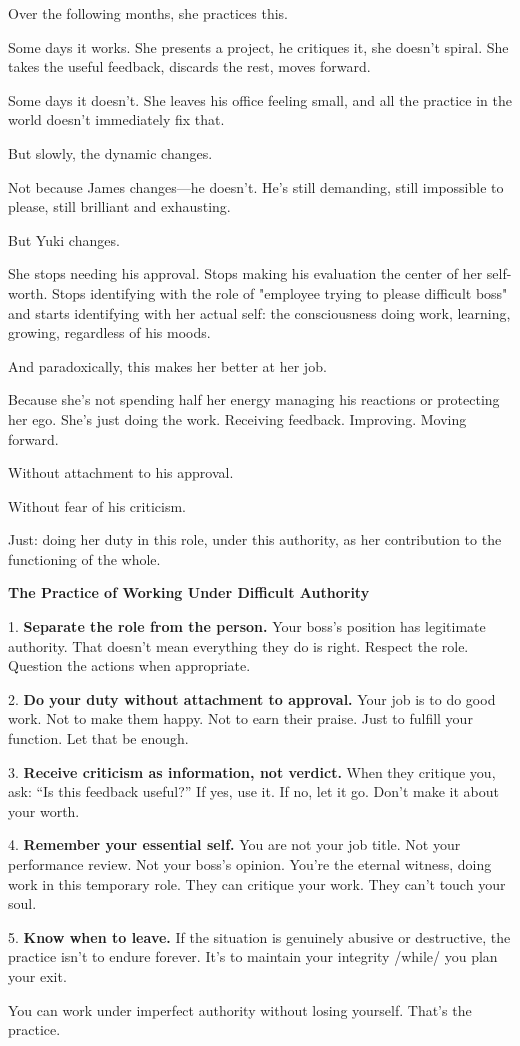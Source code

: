 \documentclass[11pt,twoside]{book}
\begin{document}
Over the following months, she practices this.

Some days it works. She presents a project, he critiques it, she doesn't spiral. She takes the useful feedback, discards the rest, moves forward.

Some days it doesn't. She leaves his office feeling small, and all the practice in the world doesn't immediately fix that.

But slowly, the dynamic changes.

Not because James changes—he doesn't. He's still demanding, still impossible to please, still brilliant and exhausting.

But Yuki changes.

She stops needing his approval. Stops making his evaluation the center of her self-worth. Stops identifying with the role of "employee trying to please difficult boss" and starts identifying with her actual self: the consciousness doing work, learning, growing, regardless of his moods.

And paradoxically, this makes her better at her job.

Because she's not spending half her energy managing his reactions or protecting her ego. She's just doing the work. Receiving feedback. Improving. Moving forward.

Without attachment to his approval.

Without fear of his criticism.

Just: doing her duty in this role, under this authority, as her contribution to the functioning of the whole.

\begin{practicebox}
\textbf{The Practice of Working Under Difficult Authority}

1. \textbf{Separate the role from the person.} Your boss's position has legitimate authority. That doesn't mean everything they do is right. Respect the role. Question the actions when appropriate.

2. \textbf{Do your duty without attachment to approval.} Your job is to do good work. Not to make them happy. Not to earn their praise. Just to fulfill your function. Let that be enough.

3. \textbf{Receive criticism as information, not verdict.} When they critique you, ask: ``Is this feedback useful?'' If yes, use it. If no, let it go. Don't make it about your worth.

4. \textbf{Remember your essential self.} You are not your job title. Not your performance review. Not your boss's opinion. You're the eternal witness, doing work in this temporary role. They can critique your work. They can't touch your soul.

5. \textbf{Know when to leave.} If the situation is genuinely abusive or destructive, the practice isn't to endure forever. It's to maintain your integrity /while/ you plan your exit.

You can work under imperfect authority without losing yourself. That's the practice.
\end{practicebox}
\end{document}
